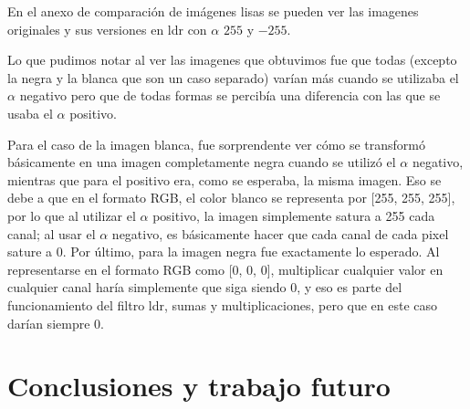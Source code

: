 \documentclass[a4paper]{article}
\begin{document}
En el anexo de comparación de imágenes lisas se pueden ver las imagenes originales y sus versiones en ldr con $\alpha$ $255$ y $-255$.

Lo que pudimos notar al ver las imagenes que obtuvimos fue que todas (excepto la negra y la blanca que son un caso separado) varían más
cuando se utilizaba el $\alpha$ negativo pero que de todas formas se percibía una diferencia con las que se usaba el $\alpha$ positivo.

Para el caso de la imagen blanca, fue sorprendente ver cómo se transformó básicamente en una imagen completamente negra cuando se utilizó el $\alpha$
negativo, mientras que para el positivo era, como se esperaba, la misma imagen. Eso se debe a que en el formato RGB, el color blanco se representa por
[255, 255, 255], por lo que al utilizar el $\alpha$ positivo, la imagen simplemente satura a 255 cada canal; al usar el $\alpha$ negativo, es básicamente
hacer que cada canal de cada pixel sature a 0.
Por último, para la imagen negra fue exactamente lo esperado. Al representarse en el formato RGB como [0, 0, 0], multiplicar cualquier valor en cualquier canal
haría simplemente que siga siendo 0, y eso es parte del funcionamiento del filtro ldr, sumas y multiplicaciones, pero que en este caso darían siempre 0.



\section{Conclusiones y trabajo futuro}
\end{document}
